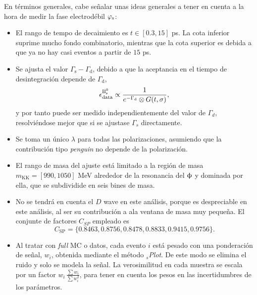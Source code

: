 En términos generales, cabe señalar unas ideas generales a tener en cuenta a la hora de medir la fase electrodébil $\varphi_{\text{s}}$:
\begin{itemize}
  \item El rango de tempo de decaimiento es $t\in[0.3,15]$ ps. La cota inferior suprime mucho fondo combinatorio, mientras que la cota superior es debida a que ya no hay casi eventos a partir de $15$ ps.
  \item Se ajusta el valor $\Gamma_{\text{s}} - \Gamma_{\text{d}}$, debido a que la aceptancia en el tiempo de desintegración depende de $\Gamma_{\text{d}}$, $$\epsilon_{\text{data}}^{\text{B}{}_{\text{s}}^{\text{0}}} \propto \frac{1}{e^{-\Gamma_{\text{d}}} \otimes G(t,\sigma)},$$ y por tanto puede ser medido independientemente del valor de $\Gamma_d$, resolviéndose mejor que si se ajustase $\Gamma_s$ directamente.
  \item Se toma un único $\lambda$ para todas las polarizaciones, asumiendo que la contribución tipo \emph{penguin} no depende de la polarización.
  \item El rango de masa del ajuste está limitado a la región de masa $m_{\text{KK}} = [990,1050]$ MeV alrededor de la resonancia del $\upphi$ y dominada por ella, que se subdividide en seis bines de masa.
  \item No se tendrá en cuenta el $D$ wave en este análisis, porque es despreciable en este análisis, al ser su contribución a ala ventana de masa muy pequeña. El conjunte de factores $C_{SP}$ empleado es $$ C_{\text{SP}}  = \{0.8463,0.8756,0.8478,0.8833,0.9415,0.9756\}.$$
  \item Al tratar con \emph{full} MC o datos, cada evento $i$ está pesado con una ponderación de señal, $w_i$, obtenida mediante el método ${}_s$\textit{Plot}. De este modo se elimina el ruido y solo se modela la señal. La verosimilitud en cada muestra se escala por un factor $w_i \,\frac{\sum w_i}{\sum w_i^2}$, para tener en cuenta los pesos en las incertidumbres de los parámetros.
\end{itemize}





